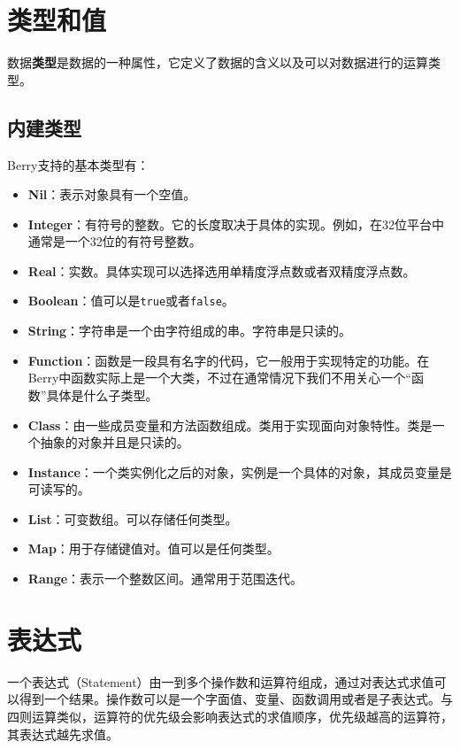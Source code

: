 \section{类型和值}

数据\textbf{类型}是数据的一种属性，它定义了数据的含义以及可以对数据进行的运算类型。

\subsection{内建类型}

Berry支持的基本类型有：

\begin{itemize}
    \item \textbf{Nil}：表示对象具有一个空值。
    \item \textbf{Integer}：有符号的整数。它的长度取决于具体的实现。例如，在32位平台中通常是一个32位的有符号整数。
    \item \textbf{Real}：实数。具体实现可以选择选用单精度浮点数或者双精度浮点数。
    \item \textbf{Boolean}：值可以是\texttt{true}或者\texttt{false}。
    \item \textbf{String}：字符串是一个由字符组成的串。字符串是只读的。
    \item \textbf{Function}：函数是一段具有名字的代码，它一般用于实现特定的功能。在Berry中函数实际上是一个大类，不过在通常情况下我们不用关心一个``函数''具体是什么子类型。
    \item \textbf{Class}：由一些成员变量和方法函数组成。类用于实现面向对象特性。类是一个抽象的对象并且是只读的。
    \item \textbf{Instance}：一个类实例化之后的对象，实例是一个具体的对象，其成员变量是可读写的。
    \item \textbf{List}：可变数组。可以存储任何类型。
    \item \textbf{Map}：用于存储键值对。值可以是任何类型。
    \item \textbf{Range}：表示一个整数区间。通常用于范围迭代。
\end{itemize}

\section{表达式}

一个表达式（Statement）由一到多个操作数和运算符组成，通过对表达式求值可以得到一个结果。操作数可以是一个字面值、变量、函数调用或者是子表达式。与四则运算类似，运算符的优先级会影响表达式的求值顺序，优先级越高的运算符，其表达式越先求值。

